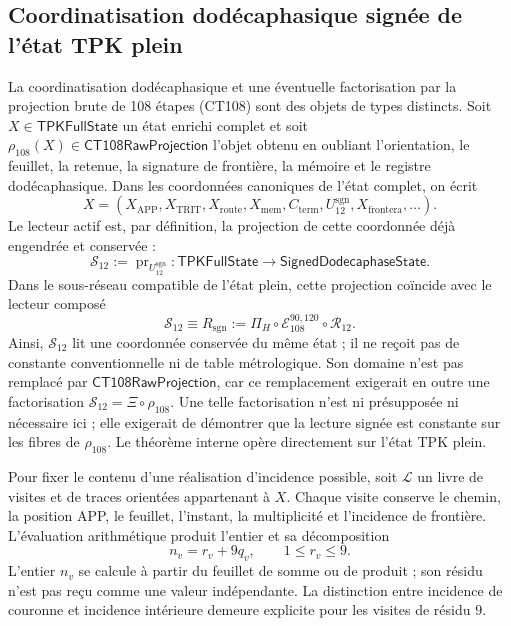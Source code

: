 \subsection{Coordinatisation dodécaphasique signée de l’état TPK plein}
\label{subsec:registro-evaluacion-incidencial}

La coordinatisation dodécaphasique et une éventuelle factorisation par la projection brute de 108 étapes (CT108) sont des objets de types distincts. Soit \(X\in\mathsf{TPKFullState}\) un état enrichi complet et soit \(\rho_{108}(X)\in\mathsf{CT108RawProjection}\) l'objet obtenu en oubliant l'orientation, le feuillet, la retenue, la signature de frontière, la mémoire et le registre dodécaphasique. Dans les coordonnées canoniques de l'état complet, on écrit
\[
 X=(X_{\mathrm{APP}},X_{\mathrm{TRIT}},X_{\mathrm{route}},X_{\mathrm{mem}},
       C_{\mathrm{term}},U_{12}^{\mathrm{sgn}},
       X_{\mathrm{frontera}},\ldots).
\]
Le lecteur actif est, par définition, la projection de cette coordonnée déjà
engendrée et conservée :
\[
 \mathcal S_{12}:=\operatorname{pr}_{U_{12}^{\mathrm{sgn}}}:
 \mathsf{TPKFullState}\longrightarrow\mathsf{SignedDodecaphaseState}.
\]
Dans le sous-réseau compatible de l’état plein, cette projection coïncide avec le
lecteur composé
\begin{equation}
 \mathcal S_{12}\equiv R_{\mathrm{sgn}}
 :=\Pi_H\circ\mathcal E_{108}^{90,120}\circ\mathcal R_{12}.
 \label{eq:registro-identidad-s12-rsgn}
\end{equation}
Ainsi, \(\mathcal S_{12}\) lit une coordonnée conservée du même état ;
il ne reçoit pas de constante
conventionnelle ni de table métrologique. Son domaine n’est pas remplacé par
\(\mathsf{CT108RawProjection}\), car ce remplacement exigerait en outre une
factorisation \(\mathcal S_{12}=\Xi\circ\rho_{108}\). Une telle factorisation n’est
ni présupposée ni nécessaire ici ; elle exigerait de démontrer que la lecture signée est
constante sur les fibres de \(\rho_{108}\). Le théorème interne opère
directement sur l’état TPK plein.

Pour fixer le contenu d'une réalisation d'incidence possible, soit \(\mathscr L\) un livre de visites et de traces orientées appartenant à \(X\). Chaque visite conserve le chemin, la position APP, le feuillet, l'instant, la multiplicité et l'incidence de frontière. L'évaluation arithmétique produit l'entier et sa décomposition
\[
 n_v=r_v+9q_v,\qquad 1\leq r_v\leq9.
\]
L'entier \(n_v\) se calcule à partir du feuillet de somme ou de produit ; son
résidu n'est pas reçu comme une valeur indépendante. La distinction entre
incidence de couronne et incidence intérieure demeure explicite pour les
visites de résidu \(9\).


